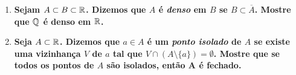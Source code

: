\documentclass[%
  a4paper,%
  12pt,%
  fleqn,%
  english,%
  brazilian,%
]{article}
\begin{document}
\begin{enumerate}[wide, labelwidth=!, labelindent=0pt]
	\item \textbf{Sejam $A \subset B \subset \mathbb R$. Dizemos que $A$ é \textit{denso} em $B$ se $B \subset \overline{A}$. Mostre que $\mathbb Q$ é denso em $\mathbb R$.}\\
	\item \textbf{Seja $A \subset \mathbb R$. Dizemos que $a \in A$ é um \textit{ponto isolado} de $A$ se existe uma vizinhança $V$ de $a$ tal que $V \cap (A \setminus \{a\}) = \emptyset$. Mostre que se todos os pontos de $A$ são isolados, então A é fechado.}\\
\end{enumerate}
\end{document}
